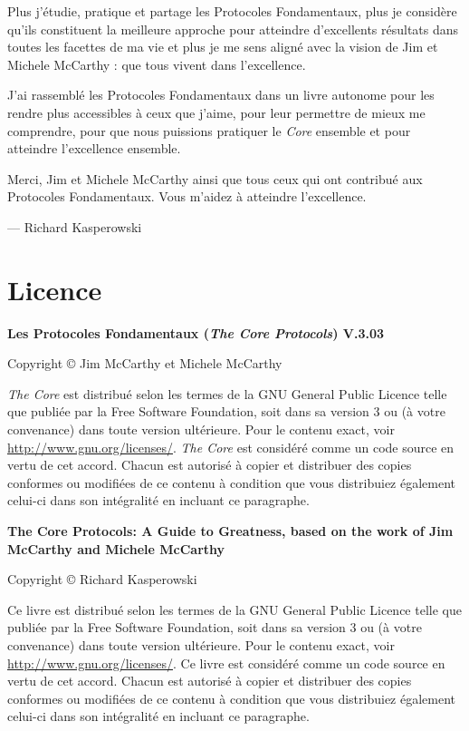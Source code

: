 \documentclass[paper=6in:9in,pagesize=pdftex,headinclude=on,footinclude=on,11pt]{scrbook}
\begin{document}
Plus j'étudie, pratique et partage les Protocoles Fondamentaux, plus je considère qu'ils constituent la meilleure approche pour
atteindre d'excellents résultats dans toutes les facettes de ma vie et plus je me sens aligné avec la vision de Jim et Michele McCarthy :
que tous vivent dans l'excellence.

J'ai rassemblé les Protocoles Fondamentaux dans un livre autonome pour les rendre plus accessibles à ceux que j'aime, pour
leur permettre de mieux me comprendre, pour que nous puissions pratiquer le \emph{Core} ensemble et pour atteindre
l'excellence ensemble.

Merci, Jim et Michele McCarthy ainsi que tous ceux qui ont contribué aux Protocoles Fondamentaux. Vous m'aidez à atteindre
l'excellence.

--- Richard Kasperowski


\chapter{Licence}

\begin{samepage}
	\noindent \textbf{Les Protocoles Fondamentaux (\emph{The Core Protocols}) V.3.03}

	\noindent Copyright \copyright{} Jim McCarthy et Michele McCarthy

	\noindent \emph{The Core} est distribué selon les termes de la GNU General Public Licence telle que publiée par la Free Software
	Foundation, soit dans sa version 3 ou (à votre convenance) dans toute version ultérieure. Pour le contenu exact, voir
	\url{http://www.gnu.org/licenses/}. \emph{The Core} est considéré comme un code source en vertu de cet accord. Chacun est autorisé
	à copier et distribuer des copies conformes ou modifiées de ce contenu à condition que vous distribuiez également celui-ci
	dans son intégralité en incluant ce paragraphe.
\end{samepage}

\begin{samepage}
	\noindent \textbf{The Core Protocols: A Guide to Greatness, based on the work of Jim McCarthy and Michele McCarthy}

	\noindent Copyright \copyright{} Richard Kasperowski

	\noindent Ce livre est distribué selon les termes de la GNU General Public Licence telle que publiée par la Free Software
	Foundation, soit dans sa version 3 ou (à votre convenance) dans toute version ultérieure. Pour le contenu exact, voir
	\url{http://www.gnu.org/licenses/}. Ce livre est considéré comme un code source en vertu de cet accord. Chacun est autorisé
	à copier et distribuer des copies conformes ou modifiées de ce contenu à condition que vous distribuiez également celui-ci
	dans son intégralité en incluant ce paragraphe.
\end{samepage}
\end{document}

